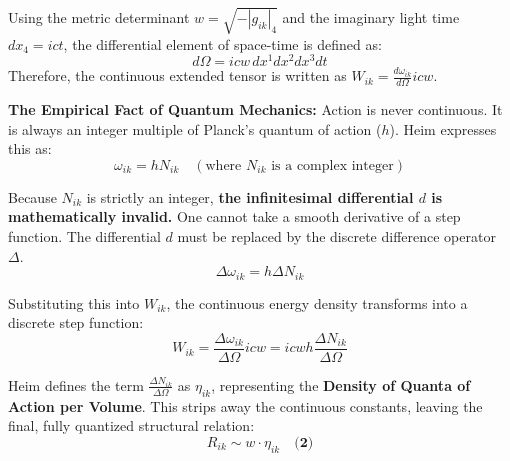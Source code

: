 \documentclass[11pt,a4paper,oneside]{article}
\begin{document}
Using the metric determinant $w = \sqrt{-|g_{ik}|_4}$ and the imaginary light time $dx_4 = ict$, the differential element of space-time is defined as:
\begin{equation}
    d\Omega = icw \, dx^1 dx^2 dx^3 dt
\end{equation}
Therefore, the continuous extended tensor is written as $W_{ik} = \frac{d\omega_{ik}}{d\Omega} icw$.

\textbf{The Empirical Fact of Quantum Mechanics:} Action is never continuous. It is always an integer multiple of Planck's quantum of action ($h$). Heim expresses this as:
\begin{equation}
    \omega_{ik} = h N_{ik} \quad (\text{where } N_{ik} \text{ is a complex integer})
\end{equation}

Because $N_{ik}$ is strictly an integer, \textbf{the infinitesimal differential $d$ is mathematically invalid.} One cannot take a smooth derivative of a step function. The differential $d$ must be replaced by the discrete difference operator $\Delta$.
\begin{equation}
    \Delta \omega_{ik} = h \Delta N_{ik}
\end{equation}

Substituting this into $W_{ik}$, the continuous energy density transforms into a discrete step function:
\begin{equation}
    W_{ik} = \frac{\Delta \omega_{ik}}{\Delta \Omega} icw = icwh \frac{\Delta N_{ik}}{\Delta \Omega}
\end{equation}

Heim defines the term $\frac{\Delta N_{ik}}{\Delta \Omega}$ as \textbf{$\eta_{ik}$}, representing the \textbf{Density of Quanta of Action per Volume}. This strips away the continuous constants, leaving the final, fully quantized structural relation:
\begin{equation}
    R_{ik} \sim w \cdot \eta_{ik} \quad \textbf{(2)}
\end{equation}
\end{document}
